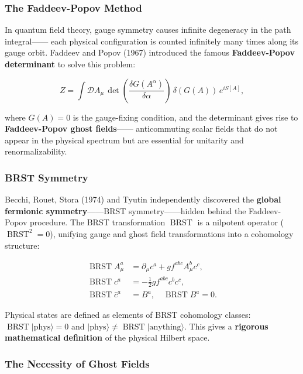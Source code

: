 \documentclass[12pt,a4paper]{article}
\theoremstyle{remark}
\DeclareMathOperator{\BRST}{BRST}
\begin{document}
\subsubsection{The Faddeev-Popov Method}

In quantum field theory, gauge symmetry causes infinite degeneracy in the path integral——
each physical configuration is counted infinitely many times along its gauge orbit.
Faddeev and Popov (1967) introduced the famous \textbf{Faddeev-Popov determinant}
to solve this problem:

\begin{equation}
    Z = \int \mathcal{D}A_\mu \, \det\left(\frac{\delta G(A^\alpha)}{\delta \alpha}\right)
    \, \delta(G(A)) \, e^{i S[A]},
\end{equation}

where $G(A) = 0$ is the gauge-fixing condition, and the determinant gives rise to
\textbf{Faddeev-Popov ghost fields}——
anticommuting scalar fields that do not appear in the physical spectrum but are essential for unitarity and renormalizability.

\subsubsection{BRST Symmetry}

Becchi, Rouet, Stora (1974) and Tyutin independently discovered the
\textbf{global fermionic symmetry}——BRST symmetry——hidden behind the Faddeev-Popov procedure. The BRST transformation $\BRST$ is a nilpotent operator ($\BRST^2 = 0$),
unifying gauge and ghost field transformations into a cohomology structure:

\begin{align}
    \BRST A_\mu^a &= \partial_\mu c^a + g f^{abc} A_\mu^b c^c, \\
    \BRST c^a &= -\frac{1}{2} g f^{abc} c^b c^c, \\
    \BRST \bar{c}^a &= B^a, \quad \BRST B^a = 0.
\end{align}

Physical states are defined as elements of BRST cohomology classes: $\BRST |\text{phys}\rangle = 0$ and
$|\text{phys}\rangle \neq \BRST |\text{anything}\rangle$.
This gives a \textbf{rigorous mathematical definition} of the physical Hilbert space.

\subsubsection{The Necessity of Ghost Fields}
\end{document}
